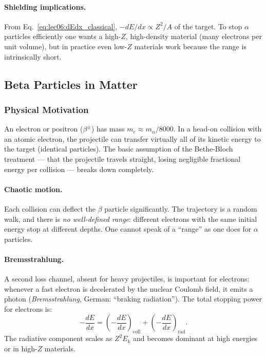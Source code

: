 
\paragraph{Shielding implications.}
From Eq.~\eqref{eq:lec06:dEdx_classical}, $-dE/dx \propto Z^2/A$ of the target.
To stop $\alpha$ particles efficiently one wants a high-$Z$, high-density
material (many electrons per unit volume), but in practice even low-$Z$
materials work because the range is intrinsically short.

\subsection{Beta Particles in Matter}
\label{subsec:lec06:beta}

\subsubsection*{Physical Motivation}
An electron or positron ($\beta^\pm$) has mass $m_e \approx m_\alpha/8000$.
In a head-on collision with an atomic electron, the projectile can transfer
virtually all of its kinetic energy to the target (identical particles).  The
basic assumption of the Bethe-Bloch treatment — that the projectile travels
straight, losing negligible fractional energy per collision — breaks down
completely.

\paragraph{Chaotic motion.}
Each collision can deflect the $\beta$ particle significantly.  The trajectory
is a random walk, and there is \emph{no well-defined range}: different electrons
with the same initial energy stop at different depths.  One cannot speak of a
``range'' as one does for $\alpha$ particles.

\paragraph{Bremsstrahlung.}
A second loss channel, absent for heavy projectiles, is important for
electrons: whenever a fast electron is decelerated by the nuclear Coulomb field,
it emits a photon (\emph{Bremsstrahlung}, German: ``braking radiation'').  The
total stopping power for electrons is:
\begin{equation}
  \label{eq:lec06:beta_stop}
  \boxed{-\frac{dE}{dx} = \left(-\frac{dE}{dx}\right)_\text{coll}
    + \left(-\frac{dE}{dx}\right)_\text{rad}.}
\end{equation}
The radiative component scales as $Z^2 E_k$ and becomes dominant at high
energies or in high-$Z$ materials.

